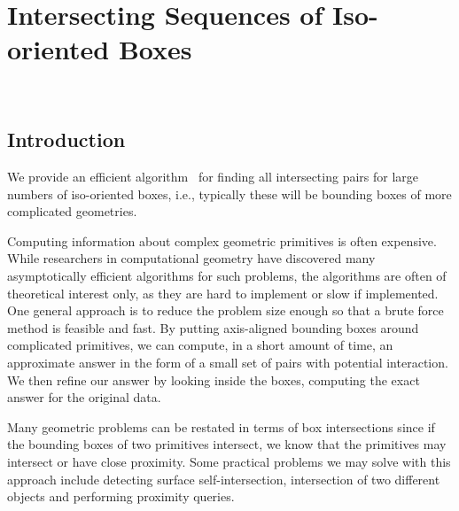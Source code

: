 
\newcommand{\LK}[1]{\textbf{L.K.:#1???}}

\ccParDims

\chapter{Intersecting Sequences of Iso-oriented Boxes}
\label{chapterBoxIntersection}
\\


\section{Introduction}

We provide an efficient algorithm~\cite{cgal:ze-fsbi-02} for finding all
intersecting pairs for large numbers of iso-oriented boxes, i.e.,
typically these will be bounding boxes of more complicated geometries.

Computing information about complex geometric primitives is often
expensive. While researchers in computational geometry have discovered
many asymptotically efficient algorithms for such problems, the
algorithms are often of theoretical interest only, as they are hard to
implement or slow if implemented. One general approach is to reduce
the problem size enough so that a brute force method is feasible and
fast. By putting axis-aligned bounding boxes around complicated
primitives, we can compute, in a short amount of time, an approximate
answer in the form of a small set of pairs with potential interaction.
We then refine our answer by looking inside the boxes, computing the
exact answer for the original data.

Many geometric problems can be restated in terms of box intersections
since if the bounding boxes of two primitives intersect, we know that
the primitives may intersect or have close proximity. Some practical
problems we may solve with this approach include detecting surface
self-intersection, intersection of two different objects and
performing proximity queries.


